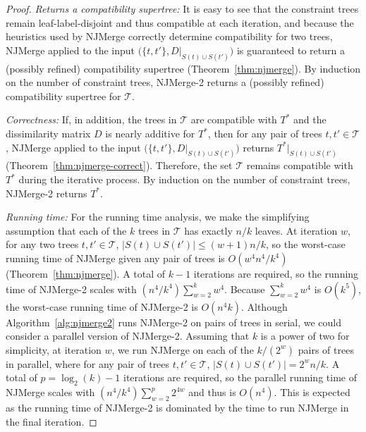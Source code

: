 \begin{proof}
\emph{Returns a compatibility supertree:} It is easy to see that the constraint trees remain leaf-label-disjoint and thus compatible at each iteration, and because the heuristics used by NJMerge correctly determine compatibility for two trees, NJMerge applied to the input $\big( \{ t, t' \}, D|_{S(t) \cup S(t')} \big)$ is guaranteed to return a (possibly refined) compatibility supertree (Theorem~\ref{thm:njmerge}).
By induction on the number of constraint trees, NJMerge-2 returns a (possibly refined) compatibility supertree for $\mathcal{T}$.

\emph{Correctness:} If, in addition, the trees in $\mathcal{T}$ are compatible with $T^*$ and the dissimilarity matrix $D$ is nearly additive for $T^*$, then for any pair of trees $t, t' \in \mathcal{T}$, NJMerge applied to the input $\big( \{ t, t' \}, D|_{S(t) \cup S(t')} \big)$ returns $T^*|_{S(t) \cup S(t')}$ (Theorem~\ref{thm:njmerge-correct}).
Therefore, the set $\mathcal{T}$ remains compatible with $T^*$ during the iterative process.
By induction on the number of constraint trees, NJMerge-2 returns $T^*$.

\emph{Running time:} For the running time analysis, we make the simplifying assumption that each of the $k$ trees in $\mathcal{T}$ has exactly $n/k$ leaves.
At iteration $w$, for any two trees $t, t' \in \mathcal{T}$, $ |S(t) \cup S(t') | \le (w + 1)n/k$, so the worst-case running time of NJMerge given any pair of trees is $O(w^4 n^4 / k^4)$ (Theorem~\ref{thm:njmerge}).
A total of $k-1$ iterations are required, so the running time of NJMerge-2 scales with $(n^4/k^4) \sum_{w=2}^k w^4$. 
Because $\sum_{w=2}^k w^4$ is $O(k^5)$, the worst-case running time of NJMerge-2 is $O(n^4k)$. Although Algorithm~\ref{alg:njmerge2} runs NJMerge-2 on pairs of trees in serial, we could consider a parallel version of NJMerge-2. 
Assuming that $k$ is a power of two for simplicity, at iteration $w$, we run NJMerge on each of the $k/(2^w)$ pairs of trees in parallel, where for any pair of trees  $t, t' \in \mathcal{T}$, $ |S(t) \cup S(t') | = 2^{w}n/k$.
A total of $p = \log_2{(k)} - 1$ iterations are required, so the parallel running time of NJMerge scales with $(n^4/k^4) \sum_{w=2}^p 2^{4w}$ and thus is $O(n^4)$.
This is expected as the running time of NJMerge-2 is dominated by the time to run NJMerge in the final iteration.
\end{proof}

\vspace{12pt}

